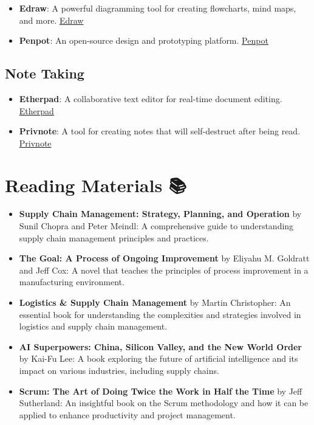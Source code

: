 \documentclass[
  letterpaper,
  DIV=11,
  numbers=noendperiod]{scrreprt}
\providecommand{\tightlist}{%
  \setlength{\itemsep}{0pt}\setlength{\parskip}{0pt}}\usepackage{longtable,booktabs,array}
\begin{document}
\begin{itemize}
\item
  \textbf{Edraw}: A powerful diagramming tool for creating flowcharts,
  mind maps, and more. \href{https://edraw.srv.viridis.info/}{Edraw}
\item
  \textbf{Penpot}: An open-source design and prototyping platform.
  \href{https://penpot.srv.viridis.info/}{Penpot}
\end{itemize}

\subsection{Note Taking 📝}\label{note-taking-1}

\begin{itemize}
\item
  \textbf{Etherpad}: A collaborative text editor for real-time document
  editing. \href{https://etherpad.srv.viridis.info/}{Etherpad}
\item
  \textbf{Privnote}: A tool for creating notes that will self-destruct
  after being read. \href{https://privnote.srv.viridis.info/}{Privnote}
\end{itemize}

\section{Reading Materials 📚}\label{reading-materials}

\begin{itemize}
\tightlist
\item
  \textbf{Supply Chain Management: Strategy, Planning, and Operation} by
  Sunil Chopra and Peter Meindl: A comprehensive guide to understanding
  supply chain management principles and practices.
\item
  \textbf{The Goal: A Process of Ongoing Improvement} by Eliyahu M.
  Goldratt and Jeff Cox: A novel that teaches the principles of process
  improvement in a manufacturing environment.
\item
  \textbf{Logistics \& Supply Chain Management} by Martin Christopher:
  An essential book for understanding the complexities and strategies
  involved in logistics and supply chain management.
\item
  \textbf{AI Superpowers: China, Silicon Valley, and the New World
  Order} by Kai-Fu Lee: A book exploring the future of artificial
  intelligence and its impact on various industries, including supply
  chains.
\item
  \textbf{Scrum: The Art of Doing Twice the Work in Half the Time} by
  Jeff Sutherland: An insightful book on the Scrum methodology and how
  it can be applied to enhance productivity and project management.
\end{itemize}
\end{document}
